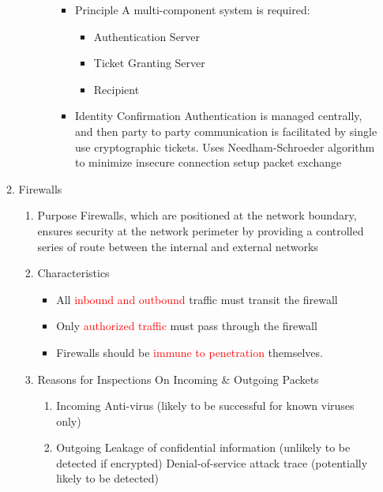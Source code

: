 \documentclass[a4paper,10pt]{article}
\newcommand{\red}[1]{\textcolor{red}{#1}}
\begin{document}
\begin{enumerate}
\begin{enumerate}
\begin{enumerate}
\begin{enumerate}
\begin{itemize}
                  \item Principle
                    \newline A multi-component system is required:
                    \begin{itemize}
                      \item Authentication Server
                      \item Ticket Granting Server
                      \item Recipient
                    \end{itemize}
                  \item Identity Confirmation
                    \newline Authentication is managed centrally, and then party to party communication is facilitated by single use cryptographic tickets.
                    \newline Uses Needham-Schroeder algorithm to minimize insecure connection setup packet exchange
                \end{itemize}
            \end{enumerate}
        \end{enumerate}
        
      \item Firewalls
        \begin{enumerate}
          \item Purpose
            \newline Firewalls, which are positioned at the network boundary, ensures security at the network perimeter by providing a controlled series of route between the internal and external networks
          \item Characteristics
            \begin{itemize}
              \item All \red{inbound and outbound} traffic must transit the firewall
              \item Only \red{authorized traffic} must pass through the firewall
              \item Firewalls should be \red{immune to penetration} themselves.
            \end{itemize}
          \item Reasons for Inspections On Incoming \& Outgoing Packets
            \begin{enumerate}
              \item Incoming
                \newline Anti-virus (likely to be successful for known viruses only)
              \item Outgoing
                \newline Leakage of confidential information (unlikely to be detected if encrypted)
                \newline Denial-of-service attack trace (potentially likely to be detected)
            \end{enumerate}
        \end{enumerate}
        

\end{enumerate}
\end{enumerate}
\end{document}
